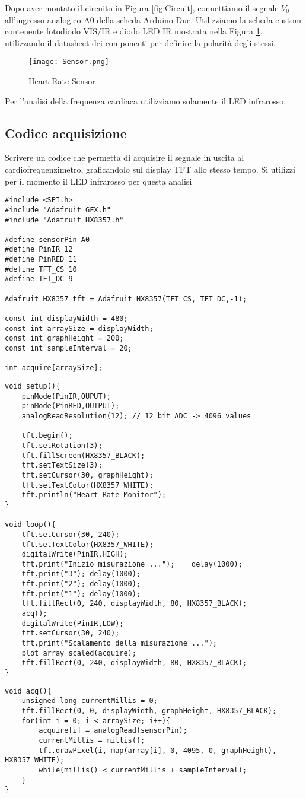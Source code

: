 Dopo aver montato il circuito in Figura \ref{fig:Circuit}, connettiamo il segnale $V_0$ all'ingresso analogico A0 della scheda Arduino Due. Utilizziamo la scheda custom contenente fotodiodo VIS/IR e diodo LED IR mostrata nella Figura \ref{fig:HRS}, utilizzando il datasheet dei componenti per definire la polarità degli stessi.
\begin{figure}[H]
    \centering
    \texttt{[image: Sensor.png]}
    \caption{Heart Rate Sensor}
    \label{fig:HRS}
\end{figure}
Per l'analisi della frequenza cardiaca utilizziamo solamente il LED infrarosso.
\subsection{Codice acquisizione}
Scrivere un codice che permetta di acquisire il segnale in uscita al cardiofrequenzimetro, graficandolo sul display TFT allo stesso tempo. Si utilizzi per il momento il LED infrarosso per questa analisi
\begin{lstlisting}[frame=single, language=Arduino]
#include <SPI.h>
#include "Adafruit_GFX.h"
#include "Adafruit_HX8357.h"

#define sensorPin A0
#define PinIR 12
#define PinRED 11
#define TFT_CS 10
#define TFT_DC 9

Adafruit_HX8357 tft = Adafruit_HX8357(TFT_CS, TFT_DC,-1); 

const int displayWidth = 480;
const int arraySize = displayWidth;
const int graphHeight = 200;
const int sampleInterval = 20;

int acquire[arraySize];
\end{lstlisting}
\clearpage
\begin{lstlisting}[frame=single, language=Arduino]
void setup(){
    pinMode(PinIR,OUPUT);
    pinMode(PinRED,OUTPUT);
    analogReadResolution(12); // 12 bit ADC -> 4096 values

    tft.begin();
    tft.setRotation(3);
    tft.fillScreen(HX8357_BLACK);
    tft.setTextSize(3);
    tft.setCursor(30, graphHeight);
    tft.setTextColor(HX8357_WHITE);
    tft.println("Heart Rate Monitor");
}

void loop(){
    tft.setCursor(30, 240);
    tft.setTextColor(HX8357_WHITE);
    digitalWrite(PinIR,HIGH);
    tft.print("Inizio misurazione ...");    delay(1000);    
    tft.print("3"); delay(1000);    
    tft.print("2"); delay(1000);    
    tft.print("1"); delay(1000);
    tft.fillRect(0, 240, displayWidth, 80, HX8357_BLACK);
    acq();
    digitalWrite(PinIR,LOW);
    tft.setCursor(30, 240);
    tft.print("Scalamento della misurazione ...");
    plot_array_scaled(acquire);
    tft.fillRect(0, 240, displayWidth, 80, HX8357_BLACK);
}
\end{lstlisting}
\begin{lstlisting}[frame=single, language=Arduino]
void acq(){
    unsigned long currentMillis = 0;
    tft.fillRect(0, 0, displayWidth, graphHeight, HX8357_BLACK);
    for(int i = 0; i < arraySize; i++){
        acquire[i] = analogRead(sensorPin);
        currentMillis = millis();
        tft.drawPixel(i, map(array[i], 0, 4095, 0, graphHeight), HX8357_WHITE);
        while(millis() < currentMillis + sampleInterval);
    }
}
\end{lstlisting}
